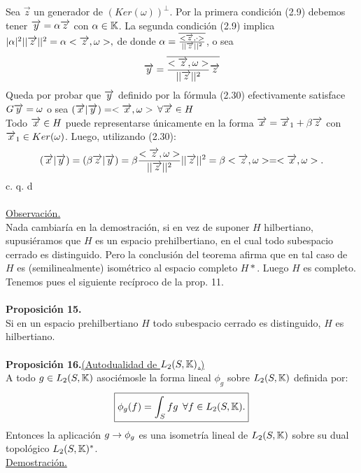 Sea $\overrightarrow{z}$ un generador de $(Ker(\omega))^{\perp}$. Por la primera condición (2.9) debemos tener $\overrightarrow{y}=\alpha \overrightarrow{z}$ con $\alpha \in \mathbb{K}$. La segunda condición (2.9) implica $| \alpha|^2 || \overrightarrow{z}||^2=\alpha < \overrightarrow{z},\omega>,$ de donde $\alpha=\overline{\frac{<\overrightarrow{z},\cdot>}{|| \overrightarrow{z} ||^2}}$, o sea 
\begin{equation}
\overrightarrow{y}=\overline{\frac{<\overrightarrow{z},\omega>}{|| \overrightarrow{z} ||^2}\overrightarrow{z}}
\end{equation}
Queda por probar que $\overrightarrow{y}$ definido por la fórmula (2.30) efectivamente satisface $G\overrightarrow{y}=\omega$ o sea $(\overrightarrow{x} | \overrightarrow{y} )=< \overrightarrow{x}, \omega >$ $\forall \overrightarrow{x} \in H$\\
Todo $\overrightarrow{x} \in H$ puede representarse únicamente en la forma $\overrightarrow{x}=\overrightarrow{x}_1+\beta \overrightarrow{z}$ con $\overrightarrow{x}_1 \in Ker(\omega)$. Luego, utilizando (2.30): \\
$$
(\overrightarrow{x} | \overrightarrow{y})=(\beta\overrightarrow{z} | \overrightarrow{y})=\beta \frac{<\overrightarrow{z},\omega>}{|| \overrightarrow{z} ||^2} ||\overrightarrow{z} ||^2=\beta <\overrightarrow{z} , \omega>=<\overrightarrow{x},\omega>.
$$
\phantom{sssssssssssssssssssssssssssssssssss sasdasdasdasdadadssada} c. q. d \\ \\
\underline{Observación.} \\
Nada cambiaría en la demostración, si en vez de suponer $H$ hilbertiano, supusiéramos que $H$ es un espacio prehilbertiano, en el cual todo subespacio cerrado es distinguido. Pero la conclusión del teorema afirma que en tal caso de $H$ es (semilinealmente) isométrico al espacio completo $H*$. Luego $H$ es completo. Tenemos pues el siguiente recíproco de la prop. 11. \\ \\
\textbf{Proposición 15.} \\
Si en un espacio prehilbertiano $H$ todo subespacio cerrado es distinguido, $H$ es hilbertiano. \\ \\
\textbf{Proposición 16.}\underline{(Autodualidad de $L_2(S,\mathbb{K})$.)}\\
A todo $g\in L_2(S,\mathbb{K})$ asociémosle la forma lineal $\phi_g$ sobre $ L_2(S,\mathbb{K})$ definida por:
\begin{equation*}
\boxed{\phi_g (f)=\int_S fg \phantom{s} \forall f\in L_2(S,\mathbb{K}).}
\end{equation*}
Entonces la aplicación $g \rightarrow \phi_g$ es una isometría lineal de $L_2(S,\mathbb{K})$ sobre su dual topológico $L_2(S,\mathbb{K})^{*}$.\\
\underline{Demostración.} \\
